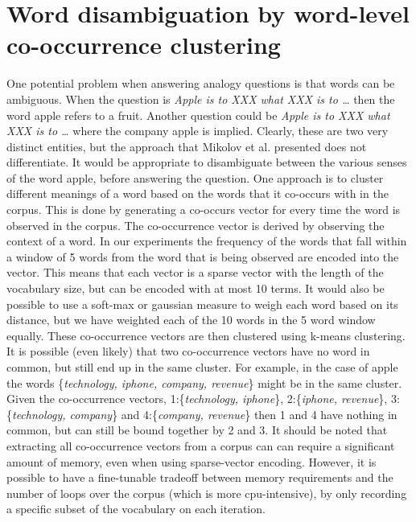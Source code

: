 \documentclass[11pt]{article}
\begin{document}
\section{Word disambiguation by word-level co-occurrence clustering}
One potential problem when answering analogy questions is that words can be ambiguous. When the question is \textit{Apple is to XXX what XXX is to \dots} then the word apple refers to a fruit. Another question could be \textit{Apple is to XXX what XXX is to \dots} where the company apple is implied. Clearly, these are two very distinct entities, but the approach that Mikolov et al. presented does not differentiate. It would be appropriate to disambiguate between the various senses of the word apple, before answering the question. One approach is to cluster different meanings of a word based on the words that it co-occurs with in the corpus. This is done by generating a co-occurs vector for every time the word is observed in the corpus. The co-occurrence vector is derived by observing the context of a word. In our experiments the frequency of the words that fall within a window of 5 words from the word that is being observed are encoded into the vector. This means that each vector is a sparse vector with the length of the vocabulary size, but can be encoded with at most 10 terms. It would also be possible to use a soft-max or gaussian measure to weigh each word based on its distance, but we have weighted each of the 10 words in the 5 word window equally. These co-occurrence vectors are then clustered using k-means clustering. It is possible (even likely) that two co-occurrence vectors have no word in common, but still end up in the same cluster. For example, in the case of apple the words \{\textit{technology, iphone, company, revenue}\} might be in the same cluster. Given the co-occurrence vectors, 1:\{\textit{technology, iphone}\}, 2:\{\textit{iphone, revenue}\}, 3:\{\textit{technology, company}\} and 4:\{\textit{company, revenue}\} then 1 and 4 have nothing in common, but can still be bound together by 2 and 3. It should be noted that extracting all co-occurrence vectors from a corpus can can require a significant amount of memory, even when using sparse-vector encoding. However, it is possible to have a fine-tunable tradeoff between memory requirements and the number of loops over the corpus (which is more cpu-intensive), by only recording a specific subset of the vocabulary on each iteration.
\end{document}
